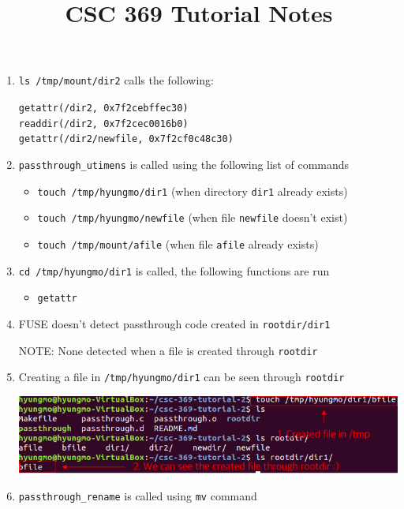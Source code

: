 \documentclass[12pt]{article}
\begin{document}
\title{CSC 369 Tutorial Notes}

\begin{enumerate}[1.]
    \item \texttt{ls /tmp/mount/dir2} calls the following:

    \bigskip

    \texttt{getattr(/dir2, 0x7f2cebffec30)}\\
    \texttt{readdir(/dir2, 0x7f2cec0016b0)}\\
    \texttt{getattr(/dir2/newfile, 0x7f2cf0c48c30)}

    \item \texttt{passthrough\_utimens} is called using the following list of commands

    \begin{itemize}
        \item \texttt{touch /tmp/hyungmo/dir1} (when directory \texttt{dir1} already exists)
        \item \texttt{touch /tmp/hyungmo/newfile} (when file \texttt{newfile} doesn't exist)
        \item \texttt{touch /tmp/mount/afile} (when file \texttt{afile} already exists)
    \end{itemize}

    \item \texttt{cd /tmp/hyungmo/dir1} is called, the following functions are run

    \begin{itemize}
        \item \texttt{getattr}
    \end{itemize}

    \item FUSE doesn't detect passthrough code created in \texttt{rootdir/dir1}

    \bigskip

    \color{red}NOTE\color{black}: None detected when a file is created through \texttt{rootdir}

    \bigskip

    \item Creating a file in \texttt{/tmp/hyungmo/dir1} can be seen through \texttt{rootdir}

    \begin{center}
    \includegraphics[width=0.8\linewidth]{images/notes_15.png}
    \end{center}

    \item \texttt{passthrough\_rename} is called using \texttt{mv} command

\end{enumerate}
\end{document}
